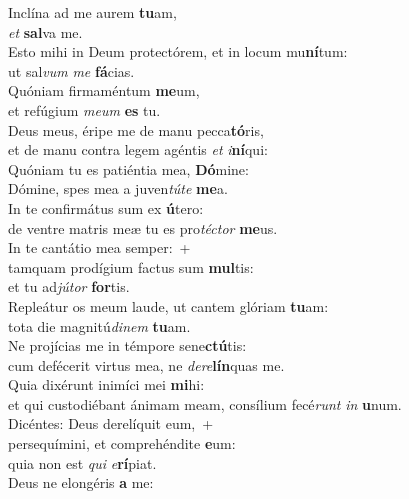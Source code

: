 \evenverse Inclína ad me aurem \textbf{tu}am,~\*\\
\evenverse \textit{et} \textbf{sal}va me.\\
\oddverse Esto mihi in Deum protectórem, et in locum mu\textbf{ní}tum:~\*\\
\oddverse ut sal\textit{vum} \textit{me} \textbf{fá}cias.\\
\evenverse Quóniam firmaméntum \textbf{me}um,~\*\\
\evenverse et refúgium \textit{me}\textit{um} \textbf{es} tu.\\
\oddverse Deus meus, éripe me de manu pecca\textbf{tó}ris,~\*\\
\oddverse et de manu contra legem agéntis \textit{et} \textit{i}\textbf{ní}qui:\\
\evenverse Quóniam tu es patiéntia mea, \textbf{Dó}mine:~\*\\
\evenverse Dómine, spes mea a juven\textit{tú}\textit{te} \textbf{me}a.\\
\oddverse In te confirmátus sum ex \textbf{ú}tero:~\*\\
\oddverse de ventre matris meæ tu es pro\textit{té}\textit{ctor} \textbf{me}us.\\
\evenverse In te cantátio mea semper:~+\\
\evenverse  tamquam prodígium factus sum \textbf{mul}tis:~\*\\
\evenverse et tu ad\textit{jú}\textit{tor} \textbf{for}tis.\\
\oddverse Repleátur os meum laude, ut cantem glóriam \textbf{tu}am:~\*\\
\oddverse tota die magnitú\textit{di}\textit{nem} \textbf{tu}am.\\
\evenverse Ne projícias me in témpore sene\textbf{ctú}tis:~\*\\
\evenverse cum defécerit virtus mea, ne \textit{de}\textit{re}\textbf{lín}quas me.\\
\oddverse Quia dixérunt inimíci mei \textbf{mi}hi:~\*\\
\oddverse et qui custodiébant ánimam meam, consílium fecé\textit{runt} \textit{in} \textbf{u}num.\\
\evenverse Dicéntes: Deus derelíquit eum,~+\\
\evenverse  persequímini, et comprehéndite \textbf{e}um:~\*\\
\evenverse quia non est \textit{qui} \textit{e}\textbf{rí}piat.\\
\oddverse Deus ne elongéris \textbf{a} me:~\*\\
